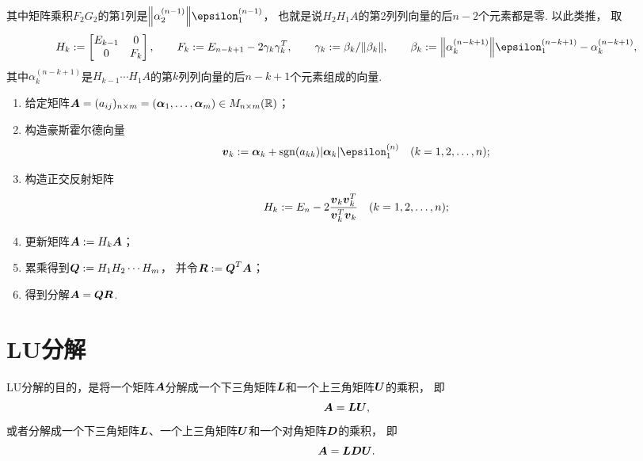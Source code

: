 其中矩阵乘积\(F_2 G_2\)的第1列是\(\norm{\alpha_2^{(n-1)}} \epsilon_1^{(n-1)}\)，
也就是说\(H_2 H_1 A\)的第2列列向量的后\(n-2\)个元素都是零.
以此类推，
取\begin{equation*}
	H_k \defeq \begin{bmatrix}
		E_{k-1} & 0 \\
		0 & F_k \\
	\end{bmatrix},
	\qquad
	F_k \defeq E_{n-k+1} - 2 \gamma_k \gamma_k^T,
	\qquad
	\gamma_k \defeq \beta_k / \norm{\beta_k},
	\qquad
	\beta_k \defeq \norm{\alpha_k^{(n-k+1)}} \epsilon^{(n-k+1)}_1 - \alpha_k^{(n-k+1)},
\end{equation*}
其中\(\alpha_k^{(n-k+1)}\)是\(H_{k-1} \dotsm H_1 A\)的第\(k\)列列向量的后\(n-k+1\)个元素组成的向量.

\begin{algorithm}[带豪斯霍尔德变换的QR分解]
\hfill
\begin{enumerate}
	\item 给定矩阵\(\boldsymbol{A} = (a_{ij})_{n \times m} = (\boldsymbol\alpha_1,\dotsc,\boldsymbol\alpha_m) \in M_{n \times m}(\mathbb{R})\)；
	\item 构造豪斯霍尔德向量\begin{align*}
		\vb{v}_k \defeq \vb\alpha_k + \sgn(a_{kk}) \abs{\vb\alpha_k} \vb\epsilon^{(n)}_1
		\quad(k=1,2,\dotsc,n);
	\end{align*}
	\item 构造正交反射矩阵\begin{align*}
		H_k := E_n - 2 \frac{\boldsymbol{v}_k \boldsymbol{v}_k^T}{\boldsymbol{v}_k^T \boldsymbol{v}_k}
		\quad(k=1,2,\dotsc,n);
	\end{align*}
	\item 更新矩阵\(\boldsymbol{A} := H_k\boldsymbol{A}\)；
	\item 累乘得到\(\boldsymbol{Q} := H_1 H_2 \dotsm H_m\)，
	并令\(\boldsymbol{R} := \boldsymbol{Q}^T \boldsymbol{A}\)；
	\item 得到分解\(\boldsymbol{A}=\boldsymbol{Q}\boldsymbol{R}\).
\end{enumerate}
\end{algorithm}

\section{LU分解}
LU分解的目的，是将一个矩阵\(\boldsymbol{A}\)分解成一个下三角矩阵\(\boldsymbol{L}\)和一个上三角矩阵\(\boldsymbol{U}\)的乘积，
即\begin{equation*}
	\boldsymbol{A} = \boldsymbol{L} \boldsymbol{U},
\end{equation*}
或者分解成一个下三角矩阵\(\boldsymbol{L}\)、一个上三角矩阵\(\boldsymbol{U}\)和一个对角矩阵\(\boldsymbol{D}\)的乘积，
即\begin{equation*}
	\boldsymbol{A} = \boldsymbol{L} \boldsymbol{D} \boldsymbol{U}.
\end{equation*}

